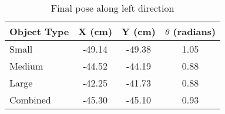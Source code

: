 \begin{table}[H]
\centering
\caption{Final pose along left direction}
\label{left}
\begin{tabular}{|l|c|c|c|}
	\hline
	\multicolumn{1}{|c|}{Object Type} & X (cm) & Y (cm) &  $\theta$ (radians)	\\ \hline
	Small                             & -49.14 & -49.38 & 1.05				    \\ %
	Medium                            & -44.52 & -44.19 & 0.88    				\\ %
	Large                             & -42.25 & -41.73 & 0.88    				\\ \hline
	Combined                          & -45.30 & -45.10 & 0.93    				\\ \hline
\end{tabular}
\end{table}
